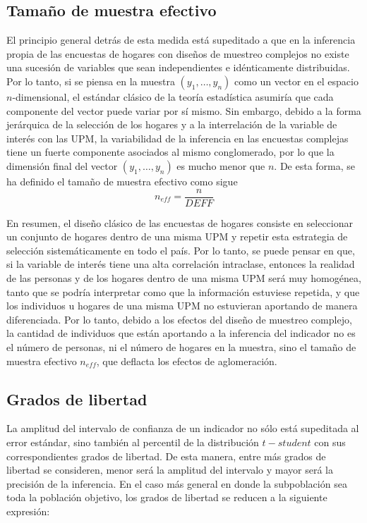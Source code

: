 \documentclass[12pt,spanish,]{book}
\begin{document}
\hypertarget{tamano-de-muestra-efectivo}{%
\subsection{Tamaño de muestra efectivo}\label{tamano-de-muestra-efectivo}}

El principio general detrás de esta medida está supeditado a que en la inferencia propia de las encuestas de hogares con diseños de muestreo complejos no existe una sucesión de variables que sean independientes e idénticamente distribuidas. Por lo tanto, si se piensa en la muestra \((y_1, \ldots, y_n)\) como un vector en el espacio \(n\)-dimensional, el estándar clásico de la teoría estadística asumiría que cada componente del vector puede variar por sí mismo. Sin embargo, debido a la forma jerárquica de la selección de los hogares y a la interrelación de la variable de interés con las UPM, la variabilidad de la inferencia en las encuestas complejas tiene un fuerte componente asociados al mismo conglomerado, por lo que la dimensión final del vector \((y_1, \ldots, y_n)\) es mucho menor que \(n\). De esta forma, se ha definido el tamaño de muestra efectivo \autocite[capítulo 6]{United_Nations_2005} como sigue
\[
n_{eff} = \frac{n}{DEFF}
\]

En resumen, el diseño clásico de las encuestas de hogares consiste en seleccionar un conjunto de hogares dentro de una misma UPM y repetir esta estrategia de selección sistemáticamente en todo el país. Por lo tanto, se puede pensar en que, si la variable de interés tiene una alta correlación intraclase, entonces la realidad de las personas y de los hogares dentro de una misma UPM será muy homogénea, tanto que se podría interpretar como que la información estuviese repetida, y que los individuos u hogares de una misma UPM no estuvieran aportando de manera diferenciada. Por lo tanto, debido a los efectos del diseño de muestreo complejo, la cantidad de individuos que están aportando a la inferencia del indicador no es el número de personas, ni el número de hogares en la muestra, sino el tamaño de muestra efectivo \(n_{eff}\), que deflacta los efectos de aglomeración.

\hypertarget{grados-de-libertad}{%
\subsection{Grados de libertad}\label{grados-de-libertad}}

La amplitud del intervalo de confianza de un indicador no sólo está supeditada al error estándar, sino también al percentil de la distribución \(t-student\) con sus correspondientes grados de libertad. De esta manera, entre más grados de libertad se consideren, menor será la amplitud del intervalo y mayor será la precisión de la inferencia. En el caso más general en donde la subpoblación sea toda la población objetivo, los grados de libertad se reducen a la siguiente expresión:
\end{document}
